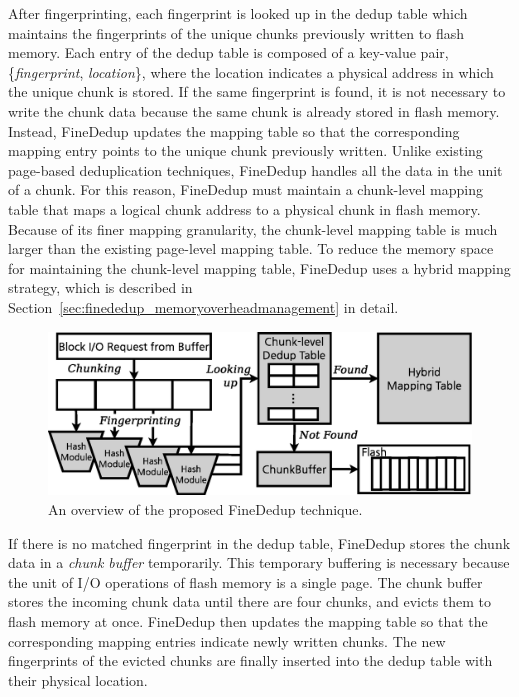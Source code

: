 After fingerprinting, 
each fingerprint is looked up in the dedup table
which maintains the fingerprints of the unique chunks previously written to flash memory.
Each entry of the dedup table is composed of a key-value pair, \{\textit{fingerprint}, \textit{location}\},
where the location indicates a physical address in which the unique chunk is stored.
If the same fingerprint is found,
it is not necessary to write the chunk data
because the same chunk is already stored in flash memory.
Instead, FineDedup updates the mapping table 
so that the corresponding mapping entry points to the unique chunk previously written.
Unlike existing page-based deduplication techniques,
FineDedup handles all the data in the unit of a chunk.
For this reason, FineDedup must maintain a chunk-level mapping table
that maps a logical chunk address to a physical chunk in flash memory.
Because of its finer mapping granularity,
the chunk-level mapping table is much larger than the existing page-level mapping table.
To reduce the memory space for maintaining the chunk-level mapping table,
FineDedup uses a hybrid mapping strategy,
which is described in Section~\ref{sec:finededup_memoryoverheadmanagement} in detail.

\begin{figure}[t]
	\center
	\includegraphics[scale=0.4]{figure/finededup/overview}
	\caption{An overview of the proposed FineDedup technique.} %
	\label{fig:overview}
\end{figure}

If there is no matched fingerprint in the dedup table,
FineDedup stores the chunk data in a \textit{chunk buffer} temporarily.
This temporary buffering is necessary 
because the unit of I/O operations of flash memory is a single page.
The chunk buffer stores the incoming chunk data until there are four chunks,
and evicts them to flash memory at once.
FineDedup then updates the mapping table 
so that the corresponding mapping entries indicate newly written chunks.
The new fingerprints of the evicted chunks are finally inserted into the dedup table with their physical location.

